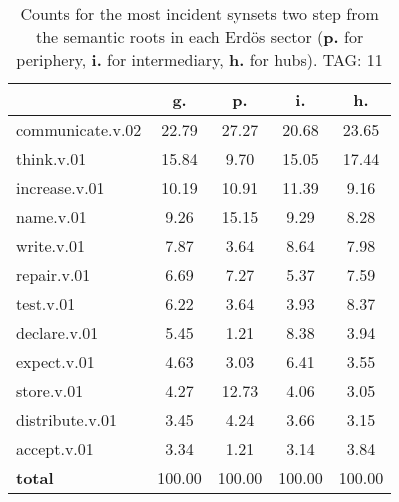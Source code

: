 \begin{table}[h!]
\begin{center}
\begin{tabular}{| l || c | c | c | c |}\hline
 & {\bf g.} & {\bf p.} & {\bf i.} & {\bf h.} \\\hline\hline
communicate.v.02 & 22.79  & 27.27  & 20.68  & 23.65 \\\hline
think.v.01 & 15.84  & 9.70  & 15.05  & 17.44 \\\hline
increase.v.01 & 10.19  & 10.91  & 11.39  & 9.16 \\\hline
name.v.01 & 9.26  & 15.15  & 9.29  & 8.28 \\\hline
write.v.01 & 7.87  & 3.64  & 8.64  & 7.98 \\\hline
repair.v.01 & 6.69  & 7.27  & 5.37  & 7.59 \\\hline
test.v.01 & 6.22  & 3.64  & 3.93  & 8.37 \\\hline
declare.v.01 & 5.45  & 1.21  & 8.38  & 3.94 \\\hline
expect.v.01 & 4.63  & 3.03  & 6.41  & 3.55 \\\hline
store.v.01 & 4.27  & 12.73  & 4.06  & 3.05 \\\hline
distribute.v.01 & 3.45  & 4.24  & 3.66  & 3.15 \\\hline
accept.v.01 & 3.34  & 1.21  & 3.14  & 3.84 \\\hline\hline
{{\bf total}} & 100.00  & 100.00  & 100.00  & 100.00 \\\hline
\end{tabular}
\caption{Counts for the most incident synsets two step from the semantic roots in each Erd\"os sector ({\bf p.} for periphery, {\bf i.} for intermediary, {\bf h.} for hubs). TAG: 11}
\end{center}
\end{table}
